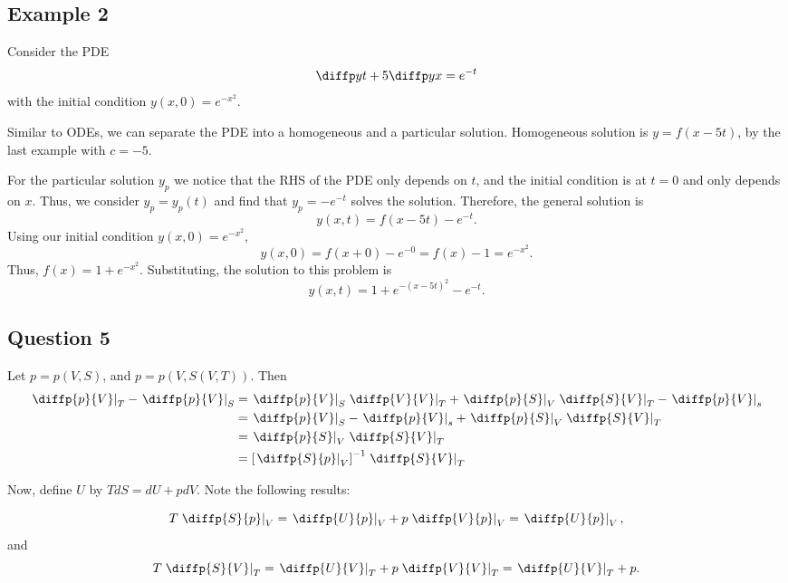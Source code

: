 \documentclass[12pt]{article}
\begin{document}
\subsection{Example 2}

Consider the PDE
\[
\diffp yt + 5\diffp yx = e^{-t}
\]
with the initial condition $y(x,0) = e^{-x^{2}}$.

Similar to ODEs, we can separate the PDE into a homogeneous and a particular solution.
Homogeneous solution is $y = f(x - 5t)$, by the last example with $c = -5$.

For the particular solution $y_p$ we notice that the RHS of the PDE only depends on $t$,
and the initial condition is at $t = 0$ and only depends on $x$.
Thus, we consider $y_p = y_p(t)$ and find that $y_p = -e^{-t}$ solves the solution.
Therefore, the general solution is
\[
y(x,t) = f(x - 5t) - e^{-t}.
\]
Using our initial condition $y(x,0) = e^{-x^{2}}$,
\[
y(x,0) = f(x+0) - e^{-0} = f(x) - 1 = e^{-x^2}.
\]
Thus, $f(x) = 1 + e^{-x^{2}}$.
Substituting, the solution to this problem is 
\[
y(x,t) = 1 + e^{-(x-5t)^{2}} - e^{-t}.
\]

\newpage
\subsection{Question 5}

Let $p = p(V,S)$, and $p=p(V,S(V,T))$. Then
\begin{equation}
\begin{aligned}
    \left.\diffp{p}{V}\right|_{T} - \left.\diffp{p}{V}\right|_{S}
            &= \left.\diffp{p}{V}\right|_{S}\left.\diffp{V}{V}\right|_{T}
                    + \left.\diffp{p}{S}\right|_{V}\left.\diffp{S}{V}\right|_{T}
                    - \left.\diffp{p}{V}\right|_{s}\\
            &= \left.\diffp{p}{V}\right|_{S}
                    - \left.\diffp{p}{V}\right|_{s}
                    + \left.\diffp{p}{S}\right|_{V}\left.\diffp{S}{V}\right|_{T}\\
            &= \left.\diffp{p}{S}\right|_{V}\left.\diffp{S}{V}\right|_{T}\\
            &= \left[\left.\diffp{S}{p}\right|_{V}\right]^{-1}\left.\diffp{S}{V}\right|_{T}
\end{aligned}
\end{equation}

Now, define $U$ by $TdS=dU+pdV$. Note the following results:

\begin{equation}
T\left.\diffp{S}{p}\right|_{V} = \left.\diffp{U}{p}\right|_{V} + p\left.\diffp{V}{p}\right|_{V} = \left.\diffp{U}{p}\right|_{V},
\end{equation}
and
\begin{equation}
T\left.\diffp{S}{V}\right|_{T} = \left.\diffp{U}{V}\right|_{T} + p\left.\diffp{V}{V}\right|_{T} = \left.\diffp{U}{V}\right|_{T} + p.
\end{equation}
\end{document}
